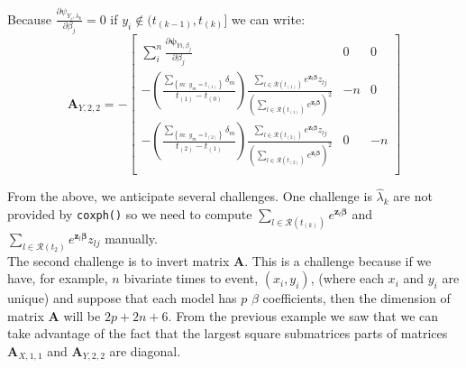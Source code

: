 \documentclass[]{article}
\begin{document}
Because $\frac{\partial \psi_{Y_i,\lambda_k}}{  \partial \beta_j} =0$ if $y_i \notin (t_{(k-1)}, t_{(k)}]$ we can write:
  \[
  \pmb{A}_{Y,2,2}
   =-\begin{bmatrix}
      \sum_i^n\frac{\partial \pmb{\psi}_{Yi,\beta_j}}{ \partial \beta_j} & 0 & 0 \\
      -\left( \frac{\sum_{\left\{m:~y_m = t_{(1)}\right\}} \delta_m}{t_{(1)} - t_{(0)}}  \right)   \frac{     \sum_{l\in \mathcal{R}(t_{(1)})}  e^{\pmb{z}_l\pmb{\beta}} z_{lj}  }{\left(   \sum_{l\in \mathcal{R}(t_{(1)})} e^{\pmb{z}_l\pmb{\beta}}  \right)^2} & -n & 0 \\
      -\left( \frac{\sum_{\left\{m:~y_m = t_{(2)}\right\}} \delta_m}{t_{(2)} - t_{(1)}}  \right)   \frac{     \sum_{l\in \mathcal{R}(t_{(2)})}  e^{\pmb{z}_l\pmb{\beta}} z_{lj}  }{\left(   \sum_{l\in \mathcal{R}(t_{(2)})} e^{\pmb{z}_l\pmb{\beta}}  \right)^2} & 0 & -n \\
  \end{bmatrix}
  \]

From the above, we anticipate several challenges. One challenge is $\hat{\lambda}_k$ are not provided by \texttt{coxph()} so we need to compute $\sum_{l\in \mathcal{R}(t_{(k)})} e^{\pmb{z}_l\pmb{\beta}}$ and $\sum_{l\in \mathcal{R}(t_2)}  e^{\pmb{z}_l\pmb{\beta}} z_{lj}$ manually.\\
The second challenge is to invert matrix $\pmb{A}$. This is a challenge because if we have, for example, $n$ bivariate times to event, $(x_i,y_i)$, (where each $x_i$ and $y_i$ are unique) and suppose that each model has $p$ $\beta$ coefficients, then the dimension of matrix $\pmb{A}$ will be $2p + 2n + 6$. From the previous example we saw that we can take advantage of the fact that the  largest square submatrices parts of matrices $\pmb{A}_{X,1,1}$ and $\pmb{A}_{Y,2,2}$ are diagonal.
\end{document}

